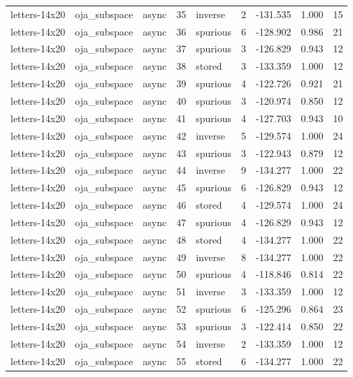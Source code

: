 \begin{tabular}{lllrlrrrr}
letters-14x20 & oja\_subspace & async & 35 & inverse & 2 & -131.535 & 1.000 & 15 \\
letters-14x20 & oja\_subspace & async & 36 & spurious & 6 & -128.902 & 0.986 & 21 \\
letters-14x20 & oja\_subspace & async & 37 & spurious & 3 & -126.829 & 0.943 & 12 \\
letters-14x20 & oja\_subspace & async & 38 & stored & 3 & -133.359 & 1.000 & 12 \\
letters-14x20 & oja\_subspace & async & 39 & spurious & 4 & -122.726 & 0.921 & 21 \\
letters-14x20 & oja\_subspace & async & 40 & spurious & 3 & -120.974 & 0.850 & 12 \\
letters-14x20 & oja\_subspace & async & 41 & spurious & 4 & -127.703 & 0.943 & 10 \\
letters-14x20 & oja\_subspace & async & 42 & inverse & 5 & -129.574 & 1.000 & 24 \\
letters-14x20 & oja\_subspace & async & 43 & spurious & 3 & -122.943 & 0.879 & 12 \\
letters-14x20 & oja\_subspace & async & 44 & inverse & 9 & -134.277 & 1.000 & 22 \\
letters-14x20 & oja\_subspace & async & 45 & spurious & 6 & -126.829 & 0.943 & 12 \\
letters-14x20 & oja\_subspace & async & 46 & stored & 4 & -129.574 & 1.000 & 24 \\
letters-14x20 & oja\_subspace & async & 47 & spurious & 4 & -126.829 & 0.943 & 12 \\
letters-14x20 & oja\_subspace & async & 48 & stored & 4 & -134.277 & 1.000 & 22 \\
letters-14x20 & oja\_subspace & async & 49 & inverse & 8 & -134.277 & 1.000 & 22 \\
letters-14x20 & oja\_subspace & async & 50 & spurious & 4 & -118.846 & 0.814 & 22 \\
letters-14x20 & oja\_subspace & async & 51 & inverse & 3 & -133.359 & 1.000 & 12 \\
letters-14x20 & oja\_subspace & async & 52 & spurious & 6 & -125.296 & 0.864 & 23 \\
letters-14x20 & oja\_subspace & async & 53 & spurious & 3 & -122.414 & 0.850 & 22 \\
letters-14x20 & oja\_subspace & async & 54 & inverse & 2 & -133.359 & 1.000 & 12 \\
letters-14x20 & oja\_subspace & async & 55 & stored & 6 & -134.277 & 1.000 & 22 \\

\end{tabular}
